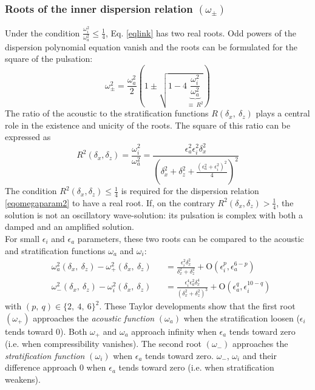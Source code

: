 \documentclass[a4paper,11pt]{article}
\begin{document}
\subsubsection{Roots of the inner dispersion relation $(\omega_\pm)$}
Under the condition $\displaystyle \frac{\omega_i^2}{\omega_a^2}\le \frac{1}{4}$, Eq. \ref{eqlink} has two real roots. Odd powers of the dispersion polynomial equation vanish and the roots can be formulated for the square of the pulsation:
\begin{equation}
	\omega_{\pm}^2
	=\frac{\omega_a^2}{2}
	\left(
	1\pm
	\sqrt{1-4\underbrace{\frac{\omega_i^2}{\omega_a^2}}_{\equiv\ R^2}}
	\right)
\label{solseq}
\end{equation}
The ratio of the acoustic to the stratification functions $R(\delta_x,\ \delta_z)$ plays a central role in the existence and unicity of the roots. The square of this ratio can be expressed as
\begin{equation}
	R^2(\delta_x,\delta_z)=
	\frac{\omega_i^2}{\omega_a^2}=
	\frac{\epsilon_a^2\epsilon_i^2\delta_x^2}
	{\left(\delta_x^2+\delta_z^2
	+\frac{(\epsilon_a^2+\epsilon_i^2)^2}{4}
	\right)^2}
\label{eqratio}
\end{equation}
The condition $\displaystyle R^2(\delta_x,\delta_z)\le \frac{1}{4}$ is required for the dispersion relation \ref{eqomegaparam2} to have a real root. If, on the contrary $\displaystyle R^2(\delta_x,\delta_z) >\frac{1}{4}$, the solution is not an oscillatory wave-solution: its pulsation is complex with both a damped and an amplified solution.\\
For small $\epsilon_i$ and $\epsilon_a$ parameters, these two roots can be compared to the acoustic and stratification functions $\omega_a$ and $\omega_i$:
\begin{subequations}
	\begin{alignat}{2}
	\label{Comp1}
	&\omega_a^2(\delta_x,\ \delta_z)-\omega_{+}^2(\delta_x,\ \delta_z)
	&&=\frac{\epsilon_i^2\delta_x^2}{\delta_x^2+\delta_z^2}
	+\mathrm{O}	(\epsilon_i^p,\epsilon_a^{6-p})\\[3mm]
	\label{Comp2}
	&\omega_{-}^2(\delta_x,\ \delta_z)-\omega_i^2(\delta_x,\ \delta_z)
	&&=\frac{\epsilon_i^4\epsilon_a^2\delta_x^4}{(\delta_x^2+\delta_z^2)^3}
	+\mathrm{O}	(\epsilon_a^q,\epsilon_i^{10-q})
	\end{alignat}	
\end{subequations}
with $(p,\ q)\in\{2,\ 4,\ 6\}^2$. These Taylor developments show that the first root $(\omega_+)$ approaches the \textit{acoustic function} $(\omega_a)$ when the stratification loosen ($\epsilon_i$ tends toward 0). Both $\omega_+$  and $\omega_a$ approach infinity when $\epsilon_a$ tends toward zero (i.e. when compressibility vanishes). The second root $(\omega_-)$ approaches the \textit{stratification function} $(\omega_i)$ when $\epsilon_a$ tends toward zero. $\omega_-$, $\omega_i$ and their difference approach 0 when $\epsilon_a$ tends toward zero (i.e. when stratification weakens). \\
\end{document}
